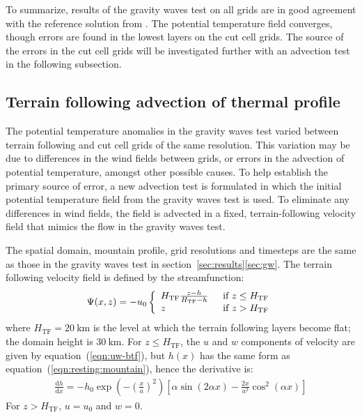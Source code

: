 \documentclass{ametsoc}
\begin{document}
To summarize, results of the gravity waves test on all grids are in good agreement with the reference solution from \citet{melvin2010}.  The potential temperature field converges, though errors are found in the lowest layers on the cut cell grids.  The source of the errors in the cut cell grids will be investigated further with an advection test in the following subsection.

\subsection{Terrain following advection of thermal profile}
The potential temperature anomalies in the gravity waves test varied between terrain following and cut cell grids of the same resolution.  This variation may be due to differences in the wind fields between grids, or errors in the advection of potential temperature, amongst other possible causes.  To help establish the primary source of error, a new advection test is formulated in which the initial potential temperature field from the gravity waves test is used.  To eliminate any differences in wind fields, the field is advected in a fixed, terrain-following velocity field that mimics the flow in the gravity waves test.

The spatial domain, mountain profile, grid resolutions and timesteps are the same as those in the gravity waves test in section~\ref{sec:results}\ref{sec:gw}.  The terrain following velocity field is defined by the streamfunction:
\begin{align}
	\Psi(x,z) = -u_0 \left\{ \begin{array}{l l}
			H_\mathrm{TF} \frac{z - h}{H_\mathrm{TF} - h} & \enskip \text{if $z \leq H_\mathrm{TF}$} \\
			z & \enskip \text{if $z > H_\mathrm{TF}$}
	\end{array} \right.
\end{align}
where \(H_\mathrm{TF} = \SI{20}{\kilo\meter}\) is the level at which the terrain following layers become flat; the domain height is \(\SI{30}{\kilo\meter}\).
For $z \leq H_\mathrm{TF}$, the $u$ and $w$ components of velocity are given by equation~(\ref{eqn:uw-btf}), but $h(x)$ has the same form as equation~(\ref{eqn:resting:mountain}), hence the derivative is:
\begin{align}
	\frac{\mathrm{d} h}{\mathrm{d} x} = -h_0 \exp \left(- \left( \frac{x}{a} \right)^2 \right) \left[ \alpha \sin \left( 2 \alpha x \right) - \frac{2x}{a^2} \cos^2\left( \alpha x \right) \right]
\end{align}
For $z > H_\mathrm{TF}$, $u = u_0$ and $w = 0$.
\end{document}
